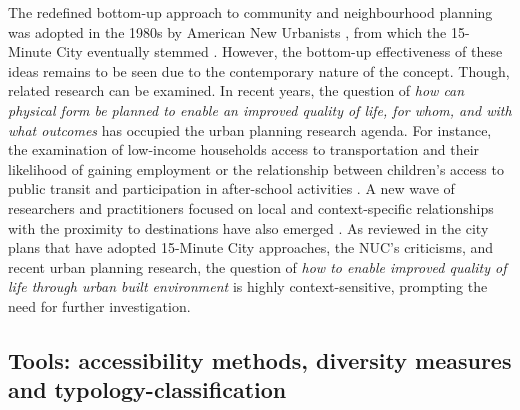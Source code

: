 \documentclass[
  authoryear,
  preprint,
  3p]{elsarticle}
\begin{document}
The redefined bottom-up approach to community and neighbourhood planning
was adopted in the 1980s by American New Urbanists
\citep{trudeau_new_2013}, from which the 15-Minute City eventually
stemmed \citep{kissfazekasCircleParadigms15minute2022}. However, the
bottom-up effectiveness of these ideas remains to be seen due to the
contemporary nature of the concept. Though, related research can be
examined. In recent years, the question of \emph{how can physical form
be planned to enable an improved quality of life, for whom, and with
what outcomes} has occupied the urban planning research agenda. For
instance, the examination of low-income households access to
transportation and their likelihood of gaining employment
\citep{blumenbergDriveWorkRelationship2017, bastiaanssenDoesBetterJob2022}
or the relationship between children's access to public transit and
participation in after-school activities
\citep{palmRolePublicTransit2020}. A new wave of researchers and
practitioners focused on local and context-specific relationships with
the proximity to destinations have also emerged
\citep{silvaProximitycentredAccessibilityConceptual2023, silvaRegionalAccessibilityUndermining2022}.
As reviewed in the city plans that have adopted 15-Minute City
approaches, the NUC's criticisms, and recent urban planning research,
the question of \emph{how to enable improved quality of life through
urban built environment} is highly context-sensitive, prompting the need
for further investigation.

\subsection{Tools: accessibility methods, diversity measures and
typology-classification}\label{tools-accessibility-methods-diversity-measures-and-typology-classification}
\end{document}
